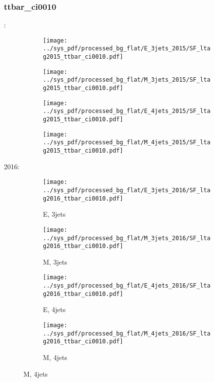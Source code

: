 \documentclass{beamer}
\begin{document}
\begin{frame}
\frametitle{ttbar_ci0010}
\fontsize{5}{1}:
\begin{figure}
\centering
\begin{subfigure}[b]{0.24\textwidth}
\texttt{[image: ../sys\_pdf/processed\_bg\_flat/E\_3jets\_2015/SF\_ltag2015\_ttbar\_ci0010.pdf]}
\end{subfigure}
\begin{subfigure}[b]{0.24\textwidth}
\texttt{[image: ../sys\_pdf/processed\_bg\_flat/M\_3jets\_2015/SF\_ltag2015\_ttbar\_ci0010.pdf]}
\end{subfigure}
\begin{subfigure}[b]{0.24\textwidth}
\texttt{[image: ../sys\_pdf/processed\_bg\_flat/E\_4jets\_2015/SF\_ltag2015\_ttbar\_ci0010.pdf]}
\end{subfigure}
\begin{subfigure}[b]{0.24\textwidth}
\texttt{[image: ../sys\_pdf/processed\_bg\_flat/M\_4jets\_2015/SF\_ltag2015\_ttbar\_ci0010.pdf]}
\end{subfigure}
\end{figure}
2016:
\begin{figure}
\centering
\begin{subfigure}[b]{0.24\textwidth}
\texttt{[image: ../sys\_pdf/processed\_bg\_flat/E\_3jets\_2016/SF\_ltag2016\_ttbar\_ci0010.pdf]}
\captionsetup{font=tiny}
\caption{E, 3jets}
\end{subfigure}
\begin{subfigure}[b]{0.24\textwidth}
\texttt{[image: ../sys\_pdf/processed\_bg\_flat/M\_3jets\_2016/SF\_ltag2016\_ttbar\_ci0010.pdf]}
\captionsetup{font=tiny}
\caption{M, 3jets}
\end{subfigure}
\begin{subfigure}[b]{0.24\textwidth}
\texttt{[image: ../sys\_pdf/processed\_bg\_flat/E\_4jets\_2016/SF\_ltag2016\_ttbar\_ci0010.pdf]}
\captionsetup{font=tiny}
\caption{E, 4jets}
\end{subfigure}
\begin{subfigure}[b]{0.24\textwidth}
\texttt{[image: ../sys\_pdf/processed\_bg\_flat/M\_4jets\_2016/SF\_ltag2016\_ttbar\_ci0010.pdf]}
\captionsetup{font=tiny}
\caption{M, 4jets}
\end{subfigure}
\end{figure}
\end{frame}
\end{document}
